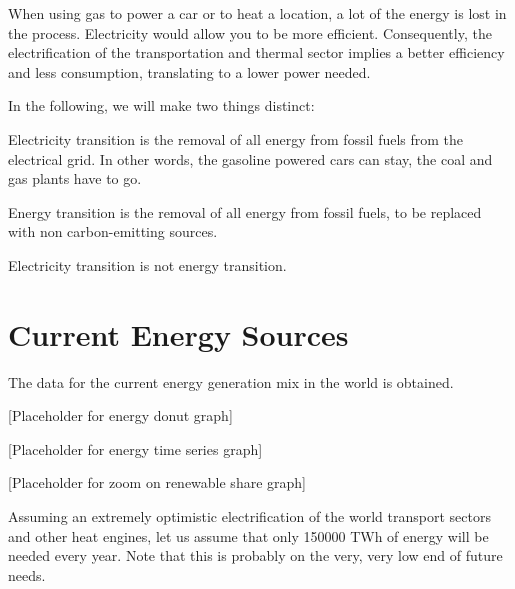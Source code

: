 When using gas to power a car or to heat a location, a lot of the energy is lost in the process. Electricity would allow you to be more efficient. Consequently, the electrification of the transportation and thermal sector implies a better efficiency and less consumption, translating to a lower power needed.

In the following, we will make two things distinct:


\begin{kaobox}[frametitle=Electricity Transition]
Electricity transition is the removal of all energy from fossil fuels from the electrical grid. In other words, the gasoline powered cars can stay, the coal and gas plants have to go.
\end{kaobox}

\begin{kaobox}[frametitle=Energy Transition]
Energy transition is the removal of all energy from fossil fuels, to be replaced with non carbon-emitting sources.
\end{kaobox}

Electricity transition is not energy transition.


\section{Current Energy Sources}

The data for the current energy generation mix in the world is obtained.

[Placeholder for energy donut graph]

[Placeholder for energy time series graph]

[Placeholder for zoom on renewable share graph]




Assuming an extremely optimistic electrification of the world transport sectors and other heat engines, let us assume that only 150000 TWh of energy will be needed every year. Note that this is probably on the very, very low end of future needs.


